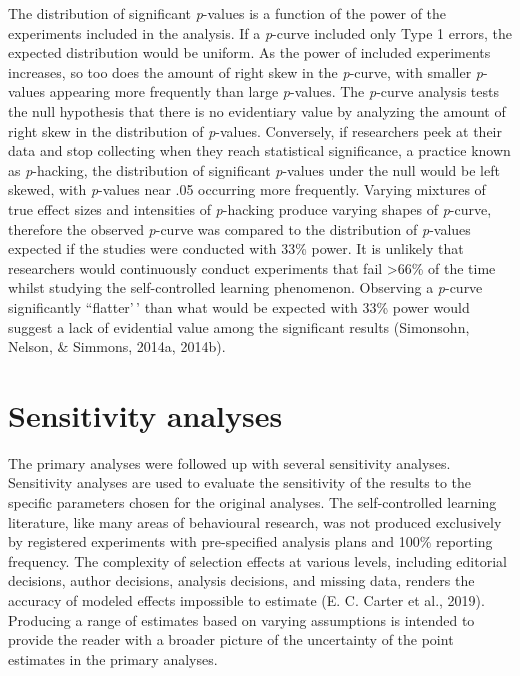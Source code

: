 \documentclass[
  english,
  man, donotrepeattitle,floatsintext]{apa7}
\begin{document}
The distribution of significant \emph{p}-values is a function of the power of the experiments included in the analysis. If a \emph{p}-curve included only Type 1 errors, the expected distribution would be uniform. As the power of included experiments increases, so too does the amount of right skew in the \emph{p}-curve, with smaller \emph{p}-values appearing more frequently than large \emph{p}-values. The \emph{p}-curve analysis tests the null hypothesis that there is no evidentiary value by analyzing the amount of right skew in the distribution of \emph{p}-values. Conversely, if researchers peek at their data and stop collecting when they reach statistical significance, a practice known as \emph{p}-hacking, the distribution of significant \emph{p}-values under the null would be left skewed, with \emph{p}-values near .05 occurring more frequently. Varying mixtures of true effect sizes and intensities of \emph{p}-hacking produce varying shapes of \emph{p}-curve, therefore the observed \emph{p}-curve was compared to the distribution of \emph{p}-values expected if the studies were conducted with 33\% power. It is unlikely that researchers would continuously conduct experiments that fail \textgreater66\% of the time whilst studying the self-controlled learning phenomenon. Observing a \emph{p}-curve significantly ``flatter'\,' than what would be expected with 33\% power would suggest a lack of evidential value among the significant results (Simonsohn, Nelson, \& Simmons, 2014a, 2014b).

\hypertarget{sensitivity-analyses}{%
\section{Sensitivity analyses}\label{sensitivity-analyses}}

The primary analyses were followed up with several sensitivity analyses. Sensitivity analyses are used to evaluate the sensitivity of the results to the specific parameters chosen for the original analyses. The self-controlled learning literature, like many areas of behavioural research, was not produced exclusively by registered experiments with pre-specified analysis plans and 100\% reporting frequency. The complexity of selection effects at various levels, including editorial decisions, author decisions, analysis decisions, and missing data, renders the accuracy of modeled effects impossible to estimate (E. C. Carter et al., 2019). Producing a range of estimates based on varying assumptions is intended to provide the reader with a broader picture of the uncertainty of the point estimates in the primary analyses.
\end{document}
